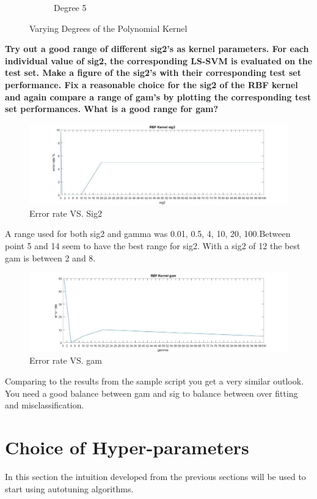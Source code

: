 \documentclass[11pt,oneside,a4paper]{article}
\begin{document}
\begin{figure}[H]
\begin{subfigure}[b]{0.4\textwidth}
	\caption{Degree 5}
\end{subfigure}
\caption{Varying Degrees of the Polynomial Kernel}
\end{figure}
\textbf{Try out a good range of
different sig2’s as kernel parameters. For each individual value of sig2, the corresponding LS-SVM
is evaluated on the test set. Make a figure of the sig2’s with their corresponding test set performance. Fix a reasonable choice for the sig2 of the RBF
kernel and again compare a range of gam’s by plotting the corresponding test set performances. What
is a good range for gam?}\\
\begin{figure}[H]
	\centering
	\includegraphics[scale=0.4]{../Figures/RBF_sig2}
	\caption{Error rate VS. Sig2}
\end{figure}
A range used for both sig2 and gamma was 0.01, 0.5, 4, 10, 20, 100.Between point 5 and 14 seem to have the best range for sig2. With a sig2 of 12 the best gam is between 2 and 8.   
\begin{figure}[H]
	\centering
	\includegraphics[scale=0.4]{../Figures/RBF_gam}
	\caption{Error rate VS. gam}
\end{figure}

Comparing to the results from the sample script you get a very similar outlook. You need a good balance between gam and sig to balance between over fitting and misclassification. 

\section{Choice of Hyper-parameters}
In this section the intuition developed from the previous sections will be used to start using autotuning algorithms. \\
\end{document}
